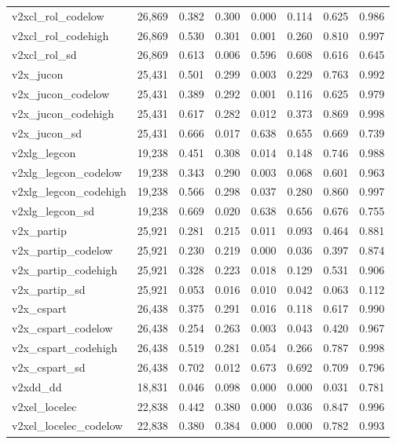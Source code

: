 \begin{table}[!htbp]
\begin{tabular}{@{\extracolsep{5pt}}lccccccc}
v2xcl\_rol\_codelow & 26,869 & 0.382 & 0.300 & 0.000 & 0.114 & 0.625 & 0.986 \\ 
v2xcl\_rol\_codehigh & 26,869 & 0.530 & 0.301 & 0.001 & 0.260 & 0.810 & 0.997 \\ 
v2xcl\_rol\_sd & 26,869 & 0.613 & 0.006 & 0.596 & 0.608 & 0.616 & 0.645 \\ 
v2x\_jucon & 25,431 & 0.501 & 0.299 & 0.003 & 0.229 & 0.763 & 0.992 \\ 
v2x\_jucon\_codelow & 25,431 & 0.389 & 0.292 & 0.001 & 0.116 & 0.625 & 0.979 \\ 
v2x\_jucon\_codehigh & 25,431 & 0.617 & 0.282 & 0.012 & 0.373 & 0.869 & 0.998 \\ 
v2x\_jucon\_sd & 25,431 & 0.666 & 0.017 & 0.638 & 0.655 & 0.669 & 0.739 \\ 
v2xlg\_legcon & 19,238 & 0.451 & 0.308 & 0.014 & 0.148 & 0.746 & 0.988 \\ 
v2xlg\_legcon\_codelow & 19,238 & 0.343 & 0.290 & 0.003 & 0.068 & 0.601 & 0.963 \\ 
v2xlg\_legcon\_codehigh & 19,238 & 0.566 & 0.298 & 0.037 & 0.280 & 0.860 & 0.997 \\ 
v2xlg\_legcon\_sd & 19,238 & 0.669 & 0.020 & 0.638 & 0.656 & 0.676 & 0.755 \\ 
v2x\_partip & 25,921 & 0.281 & 0.215 & 0.011 & 0.093 & 0.464 & 0.881 \\ 
v2x\_partip\_codelow & 25,921 & 0.230 & 0.219 & 0.000 & 0.036 & 0.397 & 0.874 \\ 
v2x\_partip\_codehigh & 25,921 & 0.328 & 0.223 & 0.018 & 0.129 & 0.531 & 0.906 \\ 
v2x\_partip\_sd & 25,921 & 0.053 & 0.016 & 0.010 & 0.042 & 0.063 & 0.112 \\ 
v2x\_cspart & 26,438 & 0.375 & 0.291 & 0.016 & 0.118 & 0.617 & 0.990 \\ 
v2x\_cspart\_codelow & 26,438 & 0.254 & 0.263 & 0.003 & 0.043 & 0.420 & 0.967 \\ 
v2x\_cspart\_codehigh & 26,438 & 0.519 & 0.281 & 0.054 & 0.266 & 0.787 & 0.998 \\ 
v2x\_cspart\_sd & 26,438 & 0.702 & 0.012 & 0.673 & 0.692 & 0.709 & 0.796 \\ 
v2xdd\_dd & 18,831 & 0.046 & 0.098 & 0.000 & 0.000 & 0.031 & 0.781 \\ 
v2xel\_locelec & 22,838 & 0.442 & 0.380 & 0.000 & 0.036 & 0.847 & 0.996 \\ 
v2xel\_locelec\_codelow & 22,838 & 0.380 & 0.384 & 0.000 & 0.000 & 0.782 & 0.993 \\ 

\end{tabular}
\end{table}
